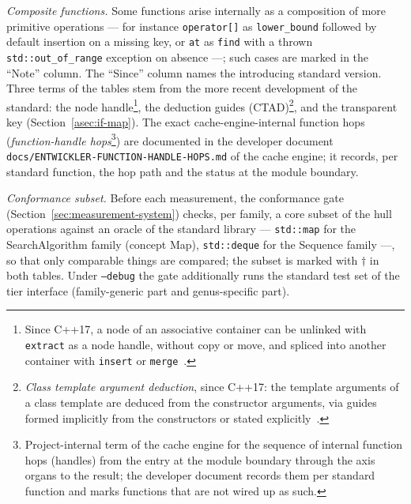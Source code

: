 \emph{Composite functions.} Some functions arise internally as a composition of more primitive
operations --- for instance \texttt{operator[]} as \texttt{lower\_bound} followed by default
insertion on a missing key, or \texttt{at} as \texttt{find} with a thrown
\texttt{std::out\_of\_range} exception on absence ---; such cases are marked in the
\enquote{Note} column. The \enquote{Since} column names the introducing standard version. Three
terms of the tables stem from the more recent development of the standard: the node
handle\footnote{Since C++17, a node of an associative container can be unlinked with
\texttt{extract} as a node handle, without copy or move, and spliced into another container with
\texttt{insert} or \texttt{merge}~\cite{talbot2016splicing}.}, the deduction guides
(CTAD)\footnote{\emph{Class template argument deduction}, since C++17: the template arguments of a
class template are deduced from the constructor arguments, via guides formed implicitly from the
constructors or stated explicitly~\cite{spertus2016ctad}.}, and the transparent key
(Section~\ref{asec:if-map}). The exact cache-engine-internal function hops
(\emph{function-handle hops}\footnote{Project-internal term of the cache engine for the sequence of
internal function hops (handles) from the entry at the module boundary through the axis organs to
the result; the developer document records them per standard function and marks functions that
are not wired up as such.}) are documented in the developer document
\texttt{docs/\allowbreak{}ENTWICKLER-\allowbreak{}FUNCTION-\allowbreak{}HANDLE-\allowbreak{}HOPS.md}
of the cache engine; it records, per standard function, the hop path and the status at the module
boundary.

\emph{Conformance subset.} Before each measurement, the conformance gate
(Section~\ref{sec:measurement-system}) checks, per family, a core subset of the hull operations
against an oracle of the standard library --- \texttt{std::map} for the SearchAlgorithm family
(concept Map), \texttt{std::deque} for the Sequence family ---, so that only comparable things are
compared; the subset is marked with $\dagger$ in both tables. Under \texttt{--debug} the gate
additionally runs the standard test set of the tier interface (family-generic part and genus-specific
part).

